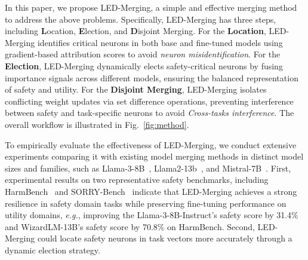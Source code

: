 
In this paper, we propose LED-Merging, a simple and effective merging method to address the above problems. Specifically, LED-Merging has three steps, including \textbf{L}ocation, \textbf{E}lection, and \textbf{D}isjoint Merging. For the \textbf{Location}, LED-Merging identifies critical neurons in both base and fine-tuned models using gradient-based attribution scores to avoid \textit{neuron misidentification}. For the \textbf{Election}, LED-Merging dynamically elects safety-critical neurons by fusing importance signals across different models, ensuring the balanced representation of safety and utility. For the \textbf{Disjoint Merging}, LED-Merging isolates conflicting weight updates via set difference operations, preventing interference between safety and task-specific neurons to avoid \textit{Cross-tasks interference}. The overall workflow is illustrated in Fig.~\ref{fig:method}.



To empirically evaluate the effectiveness of LED-Merging, we conduct extensive experiments comparing it with existing model merging methods in distinct model sizes and families, such as Llama-3-8B~\cite{llama3}, Llama2-13b~\cite{touvron2023llama2}, and Mistral-7B~\cite{jiang2023mistral7b}. First, experimental results on two representative safety benchmarks, including HarmBench~\cite{harmbench} and SORRY-Bench~\cite{xie2024sorrybench} indicate that LED-Merging achieves a strong resilience in safety domain tasks while preserving
 fine-tuning performance on utility
domains, \emph{e.g.}, improving the Llama-3-8B-Instruct's safety score by 31.4\%  and WizardLM-13B's safety score by 70.8\% on HarmBench.  Second, LED-Merging could locate safety neurons in task vectors more accurately through a dynamic election strategy.

